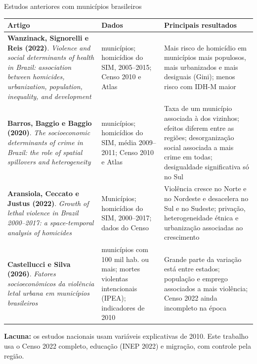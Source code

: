 \documentclass[aspectratio=169,11pt,xcolor=table]{beamer}
\begin{document}
\begin{frame}{Estudos anteriores com municípios brasileiros}
\fontsize{7}{8.4}\selectfont
\renewcommand{\arraystretch}{1.1}
\begin{tabularx}{\textwidth}{@{}>{\raggedright\arraybackslash}p{}>{\raggedright\arraybackslash}p{}>{\raggedright\arraybackslash}X@{}}
\toprule
\textbf{Artigo} & \textbf{Dados} & \textbf{Principais resultados}\\
\midrule
\textbf{Wanzinack, Signorelli e Reis (2022)}. \textit{Violence and social determinants of health in Brazil: association between homicides, urbanization, population, inequality, and development} & 5.570 municípios; homicídios do SIM, 2005--2015; Censo 2010 e Atlas & Mais risco de homicídio em municípios mais populosos, mais urbanizados e mais desiguais (Gini); menos risco com IDH-M maior\\
\textbf{Barros, Baggio e Baggio (2020)}. \textit{The socioeconomic determinants of crime in Brazil: the role of spatial spillovers and heterogeneity} & 5.565 municípios; homicídios do SIM, média 2009--2011; Censo 2010 e Atlas & Taxa de um município associada à dos vizinhos; efeitos diferem entre as regiões; desorganização social associada a mais crime em todas; desigualdade significativa só no Sul\\
\textbf{Aransiola, Ceccato e Justus (2022)}. \textit{Growth of lethal violence in Brazil 2000--2017: a space-temporal analysis of homicides} & Municípios; homicídios do SIM, 2000--2017; dados do Censo & Violência cresce no Norte e no Nordeste e desacelera no Sul e no Sudeste; privação, heterogeneidade étnica e urbanização associadas ao crescimento\\
\textbf{Castellucci e Silva (2026)}. \textit{Fatores socioeconômicos da violência letal urbana em municípios brasileiros} & 282 municípios com 100 mil hab. ou mais; mortes violentas intencionais (IPEA); indicadores de 2010 & Grande parte da variação está entre estados; população e emprego associados a mais violência; Censo 2022 ainda incompleto na época\\
\bottomrule
\end{tabularx}
\vspace{0.5em}

\scriptsize\textbf{Lacuna:} os estudos nacionais usam variáveis explicativas de 2010. Este trabalho usa o Censo 2022 completo, educação (INEP 2022) e migração, com controle pela região.
\end{frame}
\end{document}
